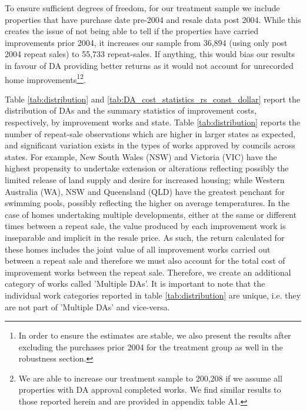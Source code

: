 \documentclass[AEJ,reqno, draftmode]{AEA} %
\begin{document}
To ensure sufficient degrees of freedom, for our treatment sample we include properties that have purchase date pre-2004 and resale data post 2004. While this creates the issue of not being able to tell if the properties have carried improvements prior 2004, it increases our sample from 36,894 (using only post 2004 repeat sales) to 55,733 repeat-sales. If anything, this would bias our results in favour of DA providing better returns as it would not account for unrecorded home improvements\footnote{In order to ensure the estimates are stable, we also present the results after excluding the purchases prior 2004 for the treatment group as well in the robustness section.}\footnote{We are able to increase our treatment sample to 200,208 if we assume all properties with DA approval completed works. We find similar results to those reported herein and are provided in appendix table A1.}. 



%

Table \ref{tab:distribution} and \ref{tab:DA_cost_statistics_rs_const_dollar} report the distribution of DAs and the summary statistics of improvement costs, respectively,  by improvement works and state. Table \ref{tab:distribution} reports the number of repeat-sale observations which are higher in larger states as expected, and significant variation exists in the types of works approved by councils across states. For example, New South Wales (NSW) and Victoria (VIC) have the highest propensity to undertake extension or alterations reflecting possibly the limited release of land supply and desire for increased housing; while Western Australia (WA), NSW and Queensland (QLD) have the greatest penchant for swimming pools, possibly reflecting the higher on average temperatures. In the case of homes undertaking multiple developments, either at the same or different times between a repeat sale, the value produced by each improvement work is inseparable and implicit in the resale price. As such, the return calculated for these homes includes the joint value of all improvement works carried out between a repeat sale and therefore we must also account for the total cost of improvement works between the repeat sale. Therefore, we create an additional category of works called 'Multiple DAs'. It is important to note that the individual work categories reported in table \ref{tab:distribution} are unique, i.e. they are not part of 'Multiple DAs' and vice-versa.
\end{document}
